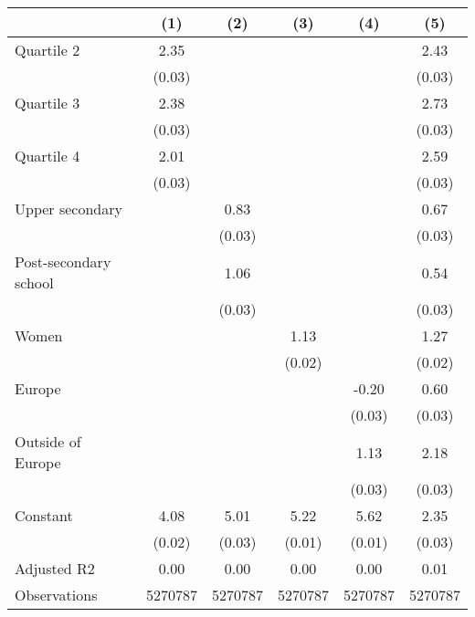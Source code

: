 
\begin{tabular}{@{}l*{5}{S[table-format={-}2.2{\tnote{***}}]}@{}}
\toprule
{} & {(1)} & {(2)} & {(3)} & {(4)} & {(5)}\tabularnewline%
\midrule
Quartile 2 & 2.35\tnote{***} &  &  &  & 2.43\tnote{***}\tabularnewline%
 & (0.03) &  &  &  & \vphantom{2} (0.03)\tabularnewline%
Quartile 3 & 2.38\tnote{***} &  &  &  & 2.73\tnote{***}\tabularnewline%
 & (0.03) &  &  &  & \vphantom{1} (0.03)\tabularnewline%
Quartile 4 & 2.01\tnote{***} &  &  &  & 2.59\tnote{***}\tabularnewline%
 & (0.03) &  &  &  & (0.03)\tabularnewline%
Upper secondary &  & 0.83\tnote{***} &  &  & 0.67\tnote{***}\tabularnewline%
 &  & (0.03) &  &  & \vphantom{1} (0.03)\tabularnewline%
Post-secondary school &  & 1.06\tnote{***} &  &  & 0.54\tnote{***}\tabularnewline%
 &  & (0.03) &  &  & (0.03)\tabularnewline%
Women &  &  & 1.13\tnote{***} &  & 1.27\tnote{***}\tabularnewline%
 &  &  & (0.02) &  & (0.02)\tabularnewline%
Europe &  &  &  & -0.20\tnote{***} & 0.60\tnote{***}\tabularnewline%
 &  &  &  & (0.03) & \vphantom{1} (0.03)\tabularnewline%
Outside of Europe &  &  &  & 1.13\tnote{***} & 2.18\tnote{***}\tabularnewline%
 &  &  &  & (0.03) & (0.03)\tabularnewline%
Constant & 4.08\tnote{***} & 5.01\tnote{***} & 5.22\tnote{***} & 5.62\tnote{***} & 2.35\tnote{***}\tabularnewline%
 & (0.02) & (0.03) & (0.01) & (0.01) & (0.03)\tabularnewline%
\midrule
Adjusted R2 & 0.00 & 0.00 & 0.00 & 0.00 & 0.01\tabularnewline%
Observations & {\num{5270787}} & {\num{5270787}} & {\num{5270787}} & {\num{5270787}} & {\num{5270787}}\tabularnewline%
\bottomrule
\end{tabular}
